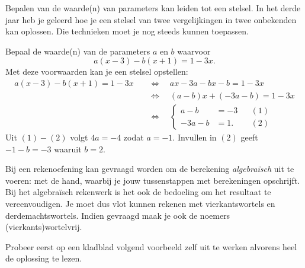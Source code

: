 \documentclass{ximera}
\begin{document}
Bepalen van de waarde(n) van parameters kan leiden tot een stelsel. 
In het derde jaar heb je geleerd hoe je een stelsel van twee vergelijkingen in twee onbekenden kan oplossen. Die technieken moet je nog steeds kunnen toepassen. 



\begin{example} 
Bepaal de waarde(n) van de parameters $a$ en $b$ waarvoor
\[
a(x-3) - b(x+1) = 1-3x.
\]
Met deze voorwaarden kan je een stelsel opstellen:
\begin{align*}
a(x-3) - b(x+1) = 1-3x \quad 
& \Leftrightarrow \quad ax-3a-bx-b=1-3x \\
& \Leftrightarrow \quad (a-b)x +(-3a-b) = 1-3x \\
& \Leftrightarrow \quad
\left\{
\begin{aligned}
a - b & = -3 && (1)\\
-3a - b & = 1. && (2)
\end{aligned}
\right.
\end{align*}
Uit $(1)-(2)$ volgt $4a = -4$ zodat $a = -1$. Invullen in $(2)$ geeft $-1-b =  -3$ waaruit $b = 2$. 
\end{example} 



Bij een rekenoefening kan gevraagd worden om de berekening \textit{ algebraïsch} uit te voeren: met de hand, waarbij je jouw tussenstappen met berekeningen opschrijft. Bij het algebraïsch rekenwerk is het ook de bedoeling om het resultaat te vereenvoudigen. Je moet dus vlot kunnen rekenen met vierkantswortels en derdemachtswortels. Indien gevraagd maak je ook de noemers (vierkants)wortelvrij. 


Probeer eerst op een kladblad volgend voorbeeld zelf uit te werken alvorens heel de oplossing te lezen. 
\end{document}
